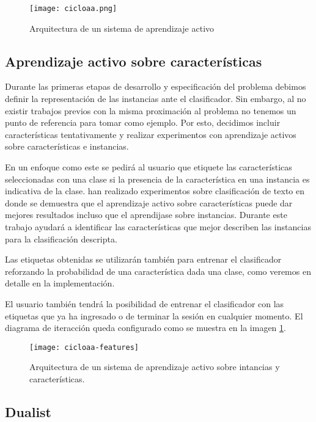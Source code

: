 \begin{figure}[h]
\caption{Arquitectura de un sistema de aprendizaje activo}
\texttt{[image: cicloaa.png]}
\centering
\end{figure}

\subsection{Aprendizaje activo sobre características}

Durante las primeras etapas de desarrollo y especificación del problema debimos definir la representación de las instancias ante el clasificador. Sin embargo, al no existir trabajos previos con la misma proximación al problema no tenemos un punto de referencia para tomar como ejemplo. Por esto, decidimos incluir características tentativamente y realizar experimentos con aprendizaje activos sobre características e instancias.


En un enfoque como este se pedirá al usuario que etiquete las características seleccionadas con una clase si la presencia de la característica en una instancia es indicativa de la clase. \citet{settles-al-features} han realizado experimentos sobre clasificación de texto en donde se demuestra que el aprendizaje activo sobre características puede dar mejores resultados incluso que el aprendijase sobre instancias. Durante este trabajo ayudará a identificar las características que mejor describen las instancias para la clasificación descripta.

Las etiquetas obtenidas se utilizarán también para entrenar el clasificador reforzando la probabilidad de una característica dada una clase, como veremos en detalle en la implementación.

El usuario también tendrá la posibilidad de entrenar el clasificador con las etiquetas que ya ha ingresado o de terminar la sesión en cualquier momento. El diagrama de iteracción queda configurado como se muestra en la imagen \ref{aa-features}.

\begin{figure}[h!]\label{aa-features}
\caption{Arquitectura de un sistema de aprendizaje activo sobre intancias y características.}
\texttt{[image: cicloaa-features]}
\centering
\end{figure}

\subsection{Dualist}


